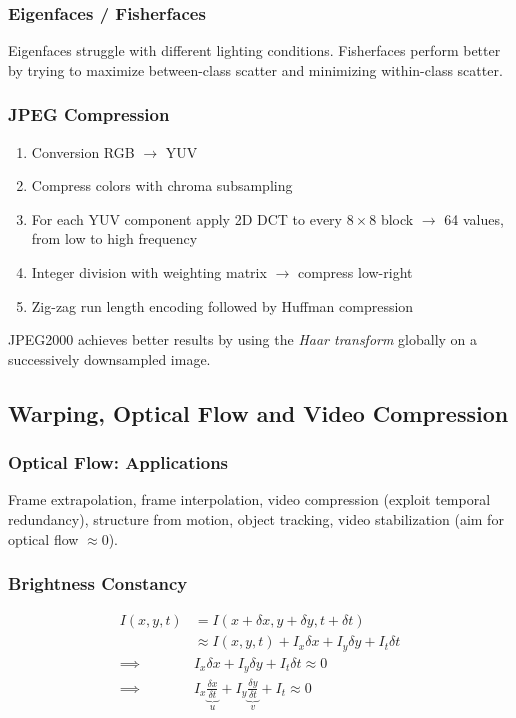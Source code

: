 \documentclass[a4paper,10pt]{article}
\begin{document}
\subsubsection{Eigenfaces / Fisherfaces}
Eigenfaces struggle with different lighting conditions. Fisherfaces perform better by trying to maximize between-class scatter and minimizing within-class scatter.

\subsubsection{JPEG Compression}
\begin{enumerate}
    \item Conversion RGB \(\to\) YUV
    \item Compress colors with chroma subsampling
    \item For each YUV component apply 2D DCT to every \(8 \times 8\) block \(\rightarrow\) 64 values, from low to high frequency
    \item Integer division with weighting matrix \(\rightarrow\) compress low-right
    \item Zig-zag run length encoding followed by Huffman compression
\end{enumerate}
JPEG2000 achieves better results by using the \emph{Haar transform} globally on a successively downsampled image.

\subsection{Warping, Optical Flow and Video Compression}
\subsubsection{Optical Flow: Applications}
Frame extrapolation, frame interpolation, video compression (exploit temporal redundancy), structure from motion, object tracking, video stabilization (aim for optical flow \( \approx 0 \)).

\subsubsection{Brightness Constancy}
\begin{align*}
    I(x,y,t) &= I(x+ \delta x, y + \delta y, t + \delta t) \\
	     &\approx I(x,y,t) + I_x \delta x + I_y \delta y + I_t \delta t \tag{Taylor approx., good if small motion}\\
    \implies &I_x \delta x + I_y \delta y + I_t \delta t \approx 0 \\
    \implies &I_x \underbrace{\frac{\delta x}{\delta t}}_u + I_y \underbrace{\frac{\delta y}{\delta t}}_v + I_t \approx 0
\end{align*}
\end{document}
